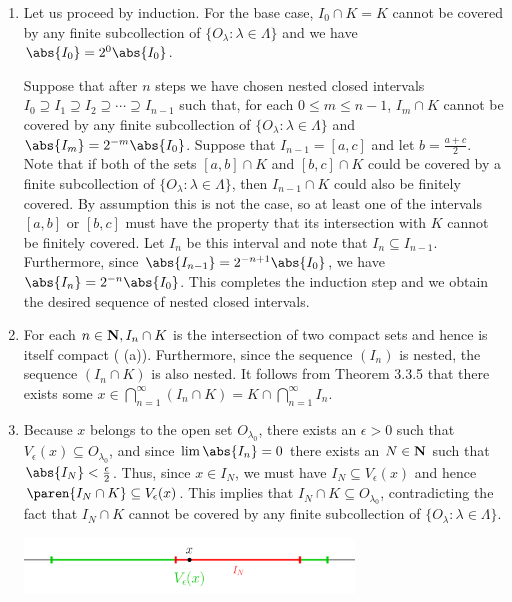 \documentclass{lew98_solutions}
\begin{document}
\begin{solution}
    \begin{enumerate}
        \item Let us proceed by induction. For the base case, \( I_0 \cap K = K \) cannot be covered by any finite subcollection of \( \{ O_{\lambda} : \lambda \in \Lambda \} \) and we have \( \abs{I_0} = 2^0 \abs{I_0} \).
        
        Suppose that after \( n \) steps we have chosen nested closed intervals \( I_0 \supseteq I_1 \supseteq I_2 \supseteq \cdots \supseteq I_{n-1} \) such that, for each \( 0 \leq m \leq n - 1 \), \( I_m \cap K \) cannot be covered by any finite subcollection of \( \{ O_{\lambda} : \lambda \in \Lambda \} \) and \( \abs{I_m} = 2^{-m} \abs{I_0} \). Suppose that \( I_{n-1} = [a, c] \) and let \( b = \tfrac{a + c}{2} \). Note that if both of the sets \( [a, b] \cap K \) and \( [b, c] \cap K \) could be covered by a finite subcollection of \( \{ O_{\lambda} : \lambda \in \Lambda \} \), then \( I_{n-1} \cap K \) could also be finitely covered. By assumption this is not the case, so at least one of the intervals \( [a, b] \) or \( [b, c] \) must have the property that its intersection with \( K \) cannot be finitely covered. Let \( I_n \) be this interval and note that \( I_n \subseteq I_{n-1} \). Furthermore, since \( \abs{I_{n-1}} = 2^{-n + 1} \abs{I_0} \), we have \( \abs{I_n} = 2^{-n} \abs{I_0} \). This completes the induction step and we obtain the desired sequence of nested closed intervals.

        \item For each \( n \in \mathbf{N}, I_n \cap K \) is the intersection of two compact sets and hence is itself compact ( (a)). Furthermore, since the sequence \( (I_n) \) is nested, the sequence \( (I_n \cap K) \) is also nested. It follows from Theorem 3.3.5 that there exists some \( x \in \bigcap_{n=1}^{\infty} (I_n \cap K) = K \cap \bigcap_{n=1}^{\infty} I_n \).

        \item Because \( x \) belongs to the open set \( O_{\lambda_0} \), there exists an \( \epsilon > 0 \) such that \( V_{\epsilon}(x) \subseteq O_{\lambda_0} \), and since \( \lim \abs{I_n} = 0 \) there exists an \( N \in \mathbf{N} \) such that \( \abs{I_N} < \tfrac{\epsilon}{2} \). Thus, since \( x \in I_N \), we must have \( I_N \subseteq V_{\epsilon}(x) \) and hence \( \paren{ I_N \cap K } \subseteq V_{\epsilon}(x) \). This implies that \( I_N \cap K \subseteq O_{\lambda_0} \), contradicting the fact that \( I_N \cap K \) cannot be covered by any finite subcollection of \( \{ O_{\lambda} : \lambda \in \Lambda \} \).
        \begin{center}
            \includegraphics[width=0.69\textwidth]{UA_Figures/UA_ex3_3_9_fig.pdf}
        \end{center}
    \end{enumerate}
\end{solution}
\end{document}
